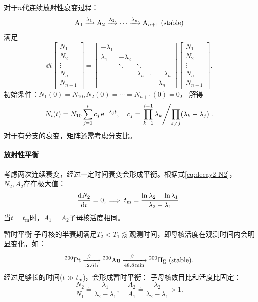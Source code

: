 \begin{example}
	对于$n$代连续放射性衰变过程：
	\[
		\mathrm{A}_1\xrightarrow[]{\lambda_1}\mathrm{A}_2\xrightarrow[]{\lambda_2}\cdots\xrightarrow[]{\lambda_n}\mathrm{A}_{n+1}\text{ (stable)}
	\]
	满足
	\begin{equation}
		\dd t
		\begin{bmatrix}
			N_1\\N_2\\\vdots\\N_n\\N_{n+1}
		\end{bmatrix}
		=
		\begin{bmatrix}
			-\lambda_1\\
			\lambda_1&-\lambda_2\\
			&\ddots&\ddots\\
			&&\lambda_{n-1}&-\lambda_n\\
			&&&\lambda_n
		\end{bmatrix}
		\begin{bmatrix}
			N_1\\N_2\\\vdots\\N_n\\N_{n+1}
		\end{bmatrix}.
	\end{equation}
	初始条件：$N_1(0)=N_{10},N_2(0)=\cdots=N_{n+1}(0)=0$，
	解得
	\begin{equation}
		N_i(t)=N_{10}\sum_{j=1}^i c_j\mathop{}\!\mathrm{e}^{-\lambda_jt},\quad c_j=\left.{\prod_{k=1}^{i-1}\lambda_k}\middle/{\prod_{k\neq j}(\lambda_k-\lambda_j)}\right..
	\end{equation}
	对于有分支的衰变，矩阵还需考虑分支比。
\end{example}

\paragraph{放射性平衡}

考虑两次连续衰变，经过一定时间衰变会形成平衡。根据式\eqref{eq:decay2 N2}，$N_2,A_2$存在极大值：
\begin{equation}
	\frac{\mathrm{d}^{{}}N_2}{\mathrm{d}{t}^{{}}}=0,\implies t_\mathrm m=\frac{\ln\lambda_2-\ln\lambda_1}{\lambda_2-\lambda_1}.
\end{equation}
当$t=t_\mathrm m$时，$A_1=A_2$子母核活度相同。

\begin{definition}
	{暂时平衡}{}
	子母核的半衰期满足$T_2<T_1\lessapprox$观测时间，即母核活度在观测时间内会明显变化，如：
	\[
		{^{200}\mathrm{Pt}}\xrightarrow[\SI{12.6}{h}]{\beta^-}{^{200}\mathrm{Au}}\xrightarrow[\SI{48.8}{min}]{\beta^-}{^{200}\mathrm{Hg}}\text{ (stable)}.
	\]
	经过足够长的时间($t\gg t_\mathrm m$)，会形成暂时平衡：
	子母核数目比和活度比固定：
	\begin{equation}
		\frac{N_2}{N_1}\doteq\frac{\lambda_1}{\lambda_2-\lambda_1},\quad\frac{A_2}{A_1}\doteq\frac{\lambda_2}{\lambda_2-\lambda_1}>1.
	\end{equation}
\end{definition}

